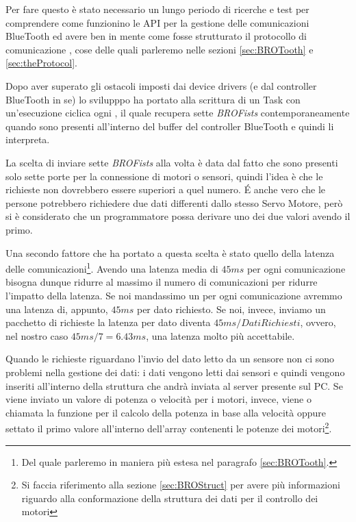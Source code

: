 Per fare questo è stato necessario un lungo periodo di ricerche e test per
comprendere come funzionino le API per la gestione delle comunicazioni
BlueTooth ed avere ben in mente come fosse strutturato il protocollo di
comunicazione \BROFist{}, cose delle quali parleremo nelle sezioni
\ref{sec:BROTooth} e \ref{sec:theProtocol}.

Dopo aver superato gli ostacoli imposti dai device drivers (e dal
controller BlueTooth in se) lo svilupppo ha portato alla scrittura di un
Task con un'esecuzione ciclica ogni , il quale recupera sette
\emph{BROFists} contemporaneamente quando sono presenti all'interno del
buffer del controller BlueTooth e quindi li interpreta.

\label{sec:why7}
La scelta di inviare sette \emph{BROFists} alla volta è data dal fatto che
sono presenti solo sette porte per la connessione di motori o sensori,
quindi l'idea è che le richieste non dovrebbero essere superiori a
quel numero. \'E anche vero che le persone potrebbero richiedere due dati
differenti dallo stesso Servo Motore, però si è considerato che un
programmatore possa derivare uno dei due valori avendo il primo.

Una secondo fattore che ha portato a questa scelta è stato quello della
latenza delle comunicazioni\footnote{Del quale parleremo in maniera più
estesa nel paragrafo \ref{sec:BROTooth}.}. Avendo una latenza media di
$45ms$ per ogni comunicazione  bisogna dunque ridurre
al massimo il numero di comunicazioni per ridurre l'impatto della latenza.
Se noi mandassimo un \BROFist{} per ogni comunicazione avremmo una latenza
di, appunto, $45ms$ per dato richiesto. Se noi, invece, inviamo un
pacchetto di richieste la latenza per dato diventa $45ms/Dati Richiesti$,
ovvero, nel nostro caso $45ms/7=6.43ms$, una latenza molto più accettabile.

Quando le richieste riguardano l'invio del dato letto da un sensore non ci
sono problemi nella gestione dei dati: i dati vengono letti dai sensori e
quindi vengono inseriti all'interno della struttura che andrà inviata al
server presente sul PC. Se viene inviato un valore di potenza o velocità
per i motori, invece, viene o chiamata la funzione per il calcolo della
potenza in base alla velocità oppure settato il primo valore all'interno
dell'array contenenti le potenze dei motori\footnote{Si faccia riferimento
alla sezione \ref{sec:BROStruct} per avere più informazioni riguardo alla
conformazione della struttura dei dati per il controllo dei motori}.

